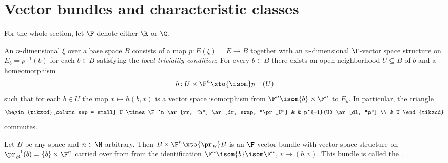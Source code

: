 \section{Vector bundles and characteristic classes}
For the whole section, let $\F$ denote either $\R$ or $\C$.
\begin{definition}
	An $n$-dimensional  $\xi$ over a base space $B$ consists of a map $p\colon E(\xi) = E \to B$ together with an $n$-dimensional $\F$-vector space structure on $E_b = p^{-1}(b)$ for each $b \in B$ satisfying the \emph{local triviality condition}:
	For every $b \in B$ there exists an open neighborhood $U \subseteq B$ of $b$ and a homeomorphism
	\begin{equation*}
		h\colon U \times \F^n \xto{\isom} p^{-1}(U)
	\end{equation*}
	such that for each $b \in U$ the map $x \mapsto h(b, x)$ is a vector space isomorphism from $\F^n \isom \{b\} \times \F^n$ to $E_b$.
	In particular, the triangle
	\begin{equation*}
		\begin{tikzcd}[column sep = small]
			U \times \F^n 
			\ar[rr, "h"]
			\ar[dr, swap, "\pr_U"]
				& & p^{-1}(U)
				\ar[dl, "p"]
				\\
				& U
		\end{tikzcd}
	\end{equation*}
	commutes.
\end{definition}
\begin{example}
	Let $B$ be any space and $n \in \N$ arbitrary.
	Then $B \times \F^n \xto{\pr_B} B$ is an $\F$-vector bundle with vector space structure on $\pr_B^{-1}(b) = \{b\} \times \F^n$ carried over from from the identification $\F^n \isom \{b\} \isom \F^n$, $v \mapsto (b, v)$.
	This bundle is called the .
\end{example}
